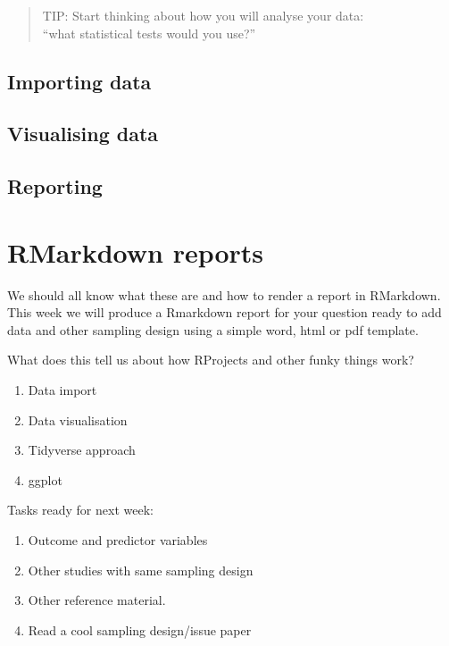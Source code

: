 \documentclass[
]{book}
\begin{document}
\begin{quote}
TIP: Start thinking about how you will analyse your data:\\
``what statistical tests would you use?''
\end{quote}

\hypertarget{importing-data}{%
\section{Importing data}\label{importing-data}}

\hypertarget{visualising-data}{%
\section{Visualising data}\label{visualising-data}}

\hypertarget{reporting}{%
\section{Reporting}\label{reporting}}

\hypertarget{rmarkdown-reports}{%
\chapter{RMarkdown reports}\label{rmarkdown-reports}}

We should all know what these are and how to render a report in RMarkdown. This week we will produce a Rmarkdown report for your question ready to add data and other sampling design using a simple word, html or pdf template.

What does this tell us about how RProjects and other funky things work?

\begin{enumerate}
\def\labelenumi{\arabic{enumi}.}
\setcounter{enumi}{2}
\item
  Data import
\item
  Data visualisation
\item
  Tidyverse approach
\item
  ggplot
\end{enumerate}

Tasks ready for next week:

\begin{enumerate}
\def\labelenumi{\arabic{enumi}.}
\item
  Outcome and predictor variables
\item
  Other studies with same sampling design
\item
  Other reference material.
\item
  Read a cool sampling design/issue paper
\end{enumerate}
\end{document}
